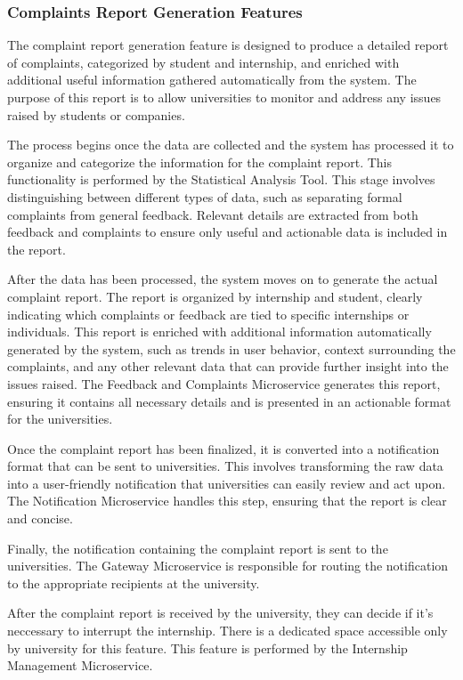 \newpage
\subsubsection{Complaints Report Generation Features}

The complaint report generation feature is designed to produce a detailed report of complaints,
categorized by student and internship, and enriched with additional useful information gathered
automatically from the system. The purpose of this report is to allow universities to monitor
and address any issues raised by students or companies.

The process begins once the data are collected and the system has processed it to organize and
categorize the information 
for the complaint report.
This functionality is performed by the Statistical Analysis Tool.
This stage involves distinguishing between different types of data,
such as separating formal complaints from general feedback. Relevant details are extracted from 
both feedback and complaints to ensure only useful and actionable data is included in the report. 

After the data has been processed, the system moves on to generate the actual complaint report.
The report is organized by internship and student, clearly indicating which complaints or feedback 
are tied to specific internships or individuals. This report is enriched with additional 
information automatically generated by the system, such as trends in user behavior, context 
surrounding the complaints, and any other relevant data that can provide further insight into 
the issues raised. The Feedback and Complaints Microservice generates this report, ensuring 
it contains all necessary details and is presented in an actionable format for the universities.

Once the complaint report has been finalized, it is converted into a notification format 
that can be sent to universities. This involves transforming the raw data into a user-friendly 
notification that universities can easily review and act upon. The Notification Microservice 
handles this step, ensuring that the report is clear and concise.

Finally, the notification containing the complaint report is sent to the universities. 
The Gateway Microservice is responsible for routing the notification to the appropriate 
recipients at the university.

After the complaint report is received by the university, they can decide if it's neccessary to
interrupt the internship. There is a dedicated space accessible only by university for this feature.
This feature is performed by the Internship Management Microservice.

